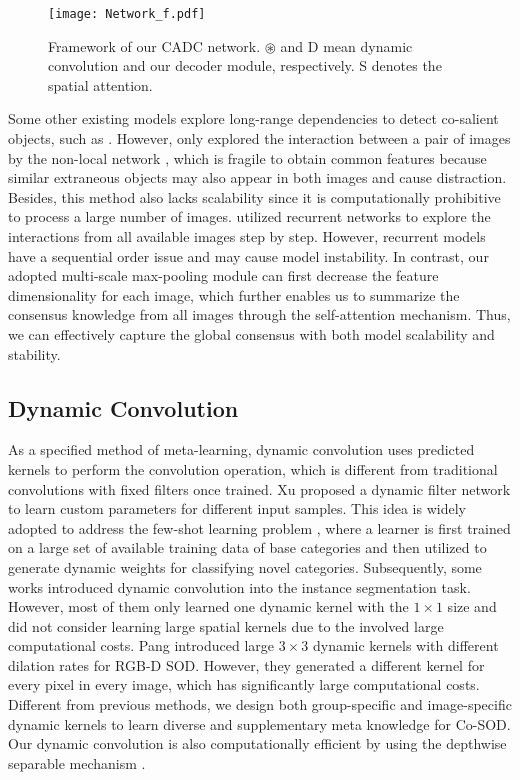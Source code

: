 \documentclass[10pt,twocolumn,letterpaper]{article}
\begin{document}
\begin{figure*}[!t]
  \graphicspath{{Figures/Network/}}
  \centering
  \texttt{[image: Network\_f.pdf]}
  \caption{Framework of our CADC network. $\circledast$ and \textcircled{\small{D}} mean dynamic convolution and our decoder module, respectively. \textcircled{\small{S}} denotes the spatial attention.}
  \label{network_fig}
  \vspace{-0.3cm}
\end{figure*}

Some other existing models explore long-range dependencies to detect co-salient objects, such as \cite{gao2020co,li2019detecting}. However, \cite{gao2020co} only explored the interaction between a pair of images by the non-local network \cite{wang2018non}, which is fragile to obtain common features because similar extraneous objects may also appear in both images and cause distraction. Besides, this method also lacks scalability since it is computationally prohibitive to process a large number of images. \cite{li2019detecting} utilized recurrent networks to explore the interactions from all available images step by step. However, recurrent models have a sequential order issue and may cause model instability. In contrast, our adopted multi-scale max-pooling module can first decrease the feature dimensionality for each image, which further enables us to summarize the consensus knowledge from all images through the self-attention mechanism. Thus, we can effectively capture the global consensus with both model scalability and stability.

\subsection{Dynamic Convolution}
As a specified method of meta-learning, dynamic convolution uses predicted kernels to perform the convolution operation, which is different from traditional convolutions with fixed filters once trained. Xu \etal \cite{jia2016dynamic} proposed a dynamic filter network to learn custom parameters for different input samples. This idea is widely adopted to address the few-shot learning problem \cite{cai2018memory, gidaris2018dynamic}, where a learner is first trained on a large set of available training data of base categories and then utilized to generate dynamic weights for classifying novel categories.
Subsequently, some works \cite{qi2020pointins,tian2020conditional} introduced dynamic convolution into the instance segmentation task.
However, most of them only learned one dynamic kernel with the $1 \times 1$ size and did not consider learning large spatial kernels due to the involved large computational costs. Pang \etal \cite{HDFNetECCV2020} introduced large $3\times 3$ dynamic kernels with different dilation rates for RGB-D SOD. However, they generated a different kernel for every pixel in every image, which has significantly large computational costs. Different from previous methods, we design both group-specific and image-specific dynamic kernels to learn diverse and supplementary meta knowledge for Co-SOD. Our dynamic convolution is also computationally efficient by using the depthwise separable mechanism \cite{howard2017mobilenets}.
\end{document}
